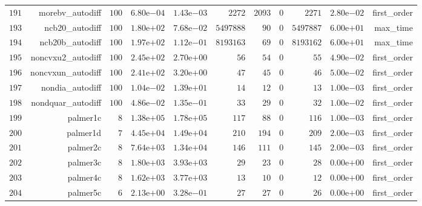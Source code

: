\documentclass[varwidth=20cm,crop=true]{standalone}
\begin{document}
\begin{longtable}{rrrrrrrrrrr}
  \(   191\) & morebv\_autodiff & \(   100\) & \( 6.80\)e\(-04\) & \( 1.43\)e\(-03\) & \(  2272\) & \(  2093\) & \(     0\) & \(  2271\) & \( 2.80\)e\(-02\) & first\_order \\
  \(   193\) & ncb20\_autodiff & \(   100\) & \( 1.80\)e\(+02\) & \( 7.68\)e\(-02\) & \(5497888\) & \(    90\) & \(     0\) & \(5497887\) & \( 6.00\)e\(+01\) & max\_time \\
  \(   194\) & ncb20b\_autodiff & \(   100\) & \( 1.97\)e\(+02\) & \( 1.12\)e\(-01\) & \(8193163\) & \(    69\) & \(     0\) & \(8193162\) & \( 6.00\)e\(+01\) & max\_time \\
  \(   195\) & noncvxu2\_autodiff & \(   100\) & \( 2.45\)e\(+02\) & \( 2.70\)e\(+00\) & \(    56\) & \(    54\) & \(     0\) & \(    55\) & \( 4.90\)e\(-02\) & first\_order \\
  \(   196\) & noncvxun\_autodiff & \(   100\) & \( 2.41\)e\(+02\) & \( 3.20\)e\(+00\) & \(    47\) & \(    45\) & \(     0\) & \(    46\) & \( 5.00\)e\(-02\) & first\_order \\
  \(   197\) & nondia\_autodiff & \(   100\) & \( 1.04\)e\(-02\) & \( 1.39\)e\(+01\) & \(    14\) & \(    12\) & \(     0\) & \(    13\) & \( 1.00\)e\(-03\) & first\_order \\
  \(   198\) & nondquar\_autodiff & \(   100\) & \( 4.86\)e\(-02\) & \( 1.35\)e\(-01\) & \(    33\) & \(    29\) & \(     0\) & \(    32\) & \( 1.00\)e\(-02\) & first\_order \\
  \(   199\) & palmer1c & \(     8\) & \( 1.38\)e\(+05\) & \( 1.78\)e\(+05\) & \(   117\) & \(    88\) & \(     0\) & \(   116\) & \( 1.00\)e\(-03\) & first\_order \\
  \(   200\) & palmer1d & \(     7\) & \( 4.45\)e\(+04\) & \( 1.49\)e\(+04\) & \(   210\) & \(   194\) & \(     0\) & \(   209\) & \( 2.00\)e\(-03\) & first\_order \\
  \(   201\) & palmer2c & \(     8\) & \( 7.64\)e\(+03\) & \( 1.34\)e\(+04\) & \(   146\) & \(   111\) & \(     0\) & \(   145\) & \( 2.00\)e\(-03\) & first\_order \\
  \(   202\) & palmer3c & \(     8\) & \( 1.80\)e\(+03\) & \( 3.93\)e\(+03\) & \(    29\) & \(    23\) & \(     0\) & \(    28\) & \( 0.00\)e\(+00\) & first\_order \\
  \(   203\) & palmer4c & \(     8\) & \( 1.62\)e\(+03\) & \( 3.77\)e\(+03\) & \(    13\) & \(    10\) & \(     0\) & \(    12\) & \( 0.00\)e\(+00\) & first\_order \\
  \(   204\) & palmer5c & \(     6\) & \( 2.13\)e\(+00\) & \( 3.28\)e\(-01\) & \(    27\) & \(    27\) & \(     0\) & \(    26\) & \( 0.00\)e\(+00\) & first\_order \\

\end{longtable}
\end{document}
